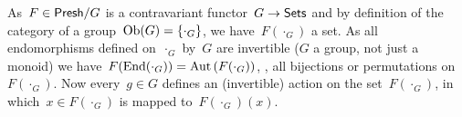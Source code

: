 \documentclass[a4paper,11pt,oneside,openany,article]{memoir}
\begin{document}
\begin{enumerate}
    \begin{solution}
      As~$F\in\mathsf{Presh}/G$ is a contravariant functor~$G\to\mathsf{Sets}$ and by definition of the category of a group~$\operatorname{Ob}(G)=\left\{ \cdot_G \right\}$, we have~$F(\cdot_G)$ a set. As all endomorphisms defined on~$\cdot_G$ by~$G$ are invertible ($G$ a group, not just a monoid) we have~$F(\operatorname{End}(\cdot_G))=\operatorname{Aut}\left( F(\cdot_G) \right)$, \ie, all bijections or permutations on~$F(\cdot_G)$. Now every~$g\in G$ defines an (invertible) action on the set~$F(\cdot_G)$, in which~$x\in F(\cdot_G)$ is mapped to~$F(\cdot_G)(x)$.
    \end{solution}

    \addtocounter{enumi}{2}






\end{enumerate}
\end{document}
